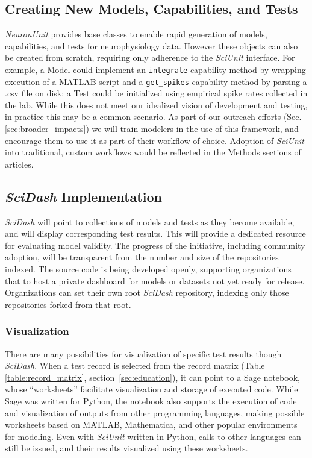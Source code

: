 \documentclass[11pt,letterpaper]{article}
\let\verbx\lstinline
\begin{document}
\subsection{Creating New Models, Capabilities, and Tests}
\textit{NeuronUnit} provides base classes to enable rapid generation of models, capabilities, and tests for neurophysiology data.  However these objects can also be created from scratch, requiring only adherence to the \textit{SciUnit} interface.  For example, a Model could implement an \verbx{integrate} capability method by wrapping execution of a MATLAB script and a \verbx{get_spikes} capability method by parsing a .csv file on disk; a Test could be initialized using empirical spike rates collected in the lab.  While this does not meet our idealized vision of development and testing, in practice this may be a common scenario.  As part of our outreach efforts (Sec. \ref{sec:broader_impacts}) we will train modelers in the use of this framework, and encourage them to use it as part of their workflow of choice.  Adoption of \textit{SciUnit} into traditional, custom workflows would be reflected in the Methods sections of articles.  

\subsection{\textit{SciDash} Implementation}
\textit{SciDash} will point to collections of models and tests as they become available, and will display corresponding test results.  This will provide a dedicated resource for evaluating model validity. The progress of the initiative, including community adoption, will be transparent from the number and size of the repositories indexed.  The source code is being developed openly\cite{scidash_portal_repo_url}, supporting organizations that to host a private dashboard for models or datasets not yet ready for release.  Organizations can set their own root \textit{SciDash} repository, indexing only those repositories forked from that root.  

\subsubsection{Visualization}
There are many possibilities for visualization of specific test results though \textit{SciDash}.  When a test record is selected from the record matrix (Table \ref{table:record_matrix}, section~\ref{sec:education}), it can point to a Sage notebook\cite{sagenb_url}, whose ``worksheets'' facilitate visualization and storage of executed code.  While Sage was written for Python, the notebook also supports the execution of code and visualization of outputs from other programming languages, making possible worksheets based on MATLAB, Mathematica, and other popular environments for modeling.  Even with \textit{SciUnit} written in Python, calls to other languages can still be issued, and their results visualized using these worksheets.
\end{document}
